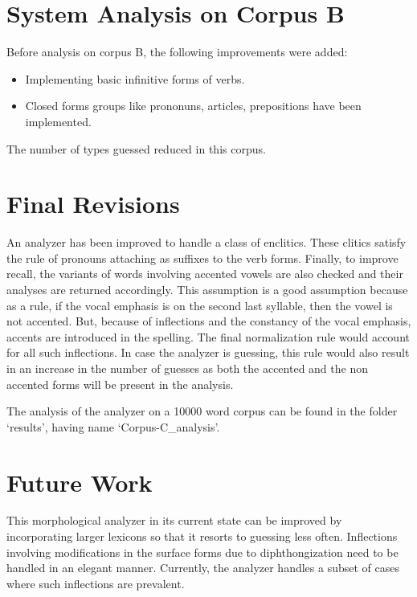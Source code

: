 \documentclass[11pt,letterpaper]{article}
\begin{document}
\section{System Analysis on Corpus B}

Before analysis on corpus B, the following improvements were added:
\begin{itemize}
\item Implementing basic infinitive forms of verbs.
\item Closed forms groups like prononuns, articles, prepositions have been implemented.
\end{itemize}
The number of types guessed reduced in this corpus.

\section{Final Revisions}
An analyzer has been improved to handle a class of enclitics. These clitics satisfy the rule of pronouns attaching as suffixes to the verb forms. Finally, to improve recall, the variants of words involving accented vowels are also checked and their analyses are returned accordingly. This assumption is a good assumption because as a rule, if the vocal emphasis is on the second last syllable, then the vowel is not accented. But, because of inflections and the constancy of the vocal emphasis, accents are introduced in the spelling. The final normalization rule would account for all such inflections. In case the analyzer is guessing, this rule would also result in an increase in the number of guesses as both the accented and the non accented forms will be present in the analysis.

The analysis of the analyzer on a 10000 word corpus can be found in the folder `results', having name `Corpus-C\_analysis'.

\section{Future Work}
This morphological analyzer in its current state can be improved by incorporating larger lexicons so that it resorts to guessing less often. Inflections involving modifications in the surface forms due to diphthongization need to be handled in an elegant manner. Currently, the analyzer handles a subset of cases where such inflections are prevalent.




\label{lastpage}
\end{document}
